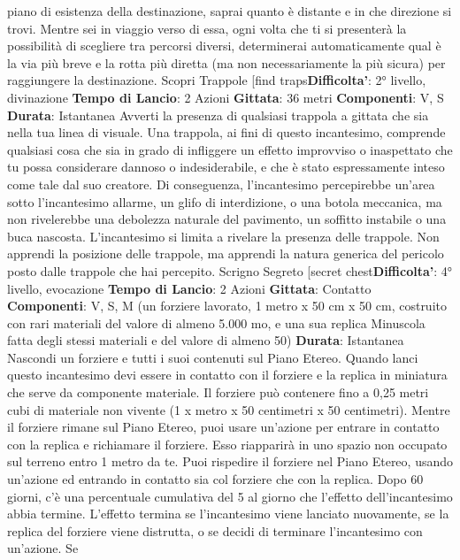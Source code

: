 \begin{multicols}{2}
piano di esistenza della destinazione, saprai quanto è
distante e in che direzione si trovi. Mentre sei in viaggio
verso di essa, ogni volta che ti si presenterà la
possibilità di scegliere tra percorsi diversi, determinerai
automaticamente qual è la via più breve e la rotta più
diretta (ma non necessariamente la più sicura) per
raggiungere la destinazione.
Scopri Trappole
[find traps\textbf{Difficolta'}:
2° livello, divinazione
\textbf{Tempo di Lancio}: 2 Azioni
\textbf{Gittata}: 36 metri
\textbf{Componenti}: V, S
\textbf{Durata}: Istantanea
Avverti la presenza di qualsiasi trappola a gittata che
sia nella tua linea di visuale. Una trappola, ai fini di
questo incantesimo, comprende qualsiasi cosa che sia
in grado di infliggere un effetto improvviso o inaspettato
che tu possa considerare dannoso o indesiderabile, e
che è stato espressamente inteso come tale dal suo
creatore. Di conseguenza, l’incantesimo percepirebbe
un’area sotto l’incantesimo allarme, un glifo di
interdizione, o una botola meccanica, ma non
rivelerebbe una debolezza naturale del pavimento, un
soffitto instabile o una buca nascosta.
L’incantesimo si limita a rivelare la presenza delle
trappole. Non apprendi la posizione delle trappole, ma
apprendi la natura generica del pericolo posto dalle
trappole che hai percepito.
Scrigno Segreto
[secret chest\textbf{Difficolta'}:
4° livello, evocazione
\textbf{Tempo di Lancio}: 2 Azioni
\textbf{Gittata}: Contatto
\textbf{Componenti}: V, S, M (un forziere lavorato, 1 metro x
50 cm x 50 cm, costruito con rari materiali del valore di
almeno 5.000 mo, e una sua replica Minuscola fatta
degli stessi materiali e del valore di almeno 50)
\textbf{Durata}: Istantanea
Nascondi un forziere e tutti i suoi contenuti sul Piano
Etereo. Quando lanci questo incantesimo devi essere in
contatto con il forziere e la replica in miniatura che
serve da componente materiale. Il forziere può
contenere fino a 0,25 metri cubi di materiale non
vivente (1 x metro x 50 centimetri x 50 centimetri).
Mentre il forziere rimane sul Piano Etereo, puoi usare
un’azione per entrare in contatto con la replica e
richiamare il forziere. Esso riapparirà in uno spazio non
occupato sul terreno entro 1 metro da te. Puoi
rispedire il forziere nel Piano Etereo, usando un’azione
ed entrando in contatto sia col forziere che con la
replica.
Dopo 60 giorni, c’è una percentuale cumulativa del 5%
al giorno che l’effetto dell’incantesimo abbia termine.
L’effetto termina se l’incantesimo viene lanciato
nuovamente, se la replica del forziere viene distrutta, o
se decidi di terminare l’incantesimo con un’azione. Se

\end{multicols}
